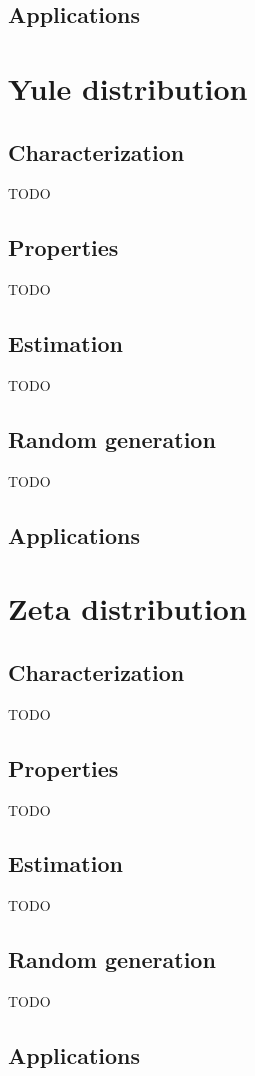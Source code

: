 \subsection{Applications}

\section{Yule distribution}
\subsection{Characterization}
TODO
\subsection{Properties}
TODO
\subsection{Estimation}
TODO
\subsection{Random generation}
TODO
\subsection{Applications}

\section{Zeta distribution}
\subsection{Characterization}
TODO
\subsection{Properties}
TODO
\subsection{Estimation}
TODO
\subsection{Random generation}
TODO
\subsection{Applications}
